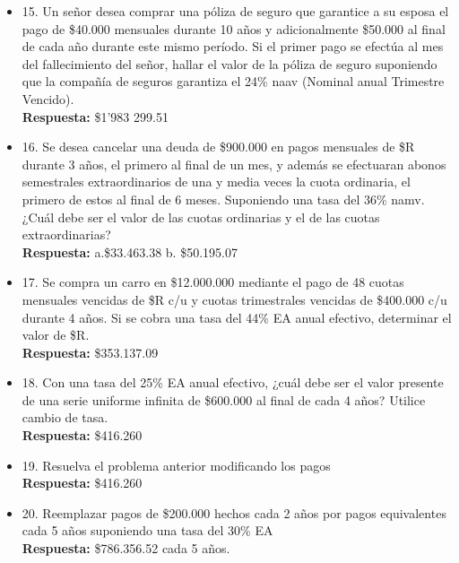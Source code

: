 \begin{itemize}
	\item 15. Un señor desea comprar una póliza de seguro que garantice a su esposa el pago de \$40.000 mensuales durante 10 años y adicionalmente \$50.000 al final de cada año durante este mismo período. Si el primer pago se efectúa al mes del fallecimiento del señor, hallar el valor de la póliza de seguro suponiendo que la compañía de seguros garantiza el 24\%  naav (Nominal anual Trimestre Vencido).\\
	\textbf{Respuesta:} \$1'983 299.51\\
	\medskip
	
	\item 16. Se desea cancelar una deuda de \$900.000 en pagos mensuales de \$R durante 3 años, el primero al final de un mes, y además se efectuaran abonos semestrales extraordinarios de una y media veces la cuota ordinaria, el primero de estos al final de 6 meses. Suponiendo una tasa del 36\% namv. ¿Cuál debe ser el valor de las cuotas ordinarias y el de las cuotas extraordinarias?\\
	\textbf{Respuesta:} a.\$33.463.38 \hspace{0,5cm} b. \$50.195.07\\
	\medskip
	
	\item 17. Se compra un carro en \$12.000.000 mediante el pago de 48 cuotas mensuales vencidas de \$R c/u y cuotas trimestrales vencidas de \$400.000 c/u durante 4 años. Si se cobra una tasa del 44\% EA  anual efectivo, determinar el valor de \$R.\\
	\textbf{Respuesta:} \$353.137.09\\
	\medskip
	
	\item 18. Con una tasa del 25\% EA  anual efectivo, ¿cuál debe ser el valor presente de una serie uniforme infinita de \$600.000 al final de cada 4 años? Utilice cambio de tasa.\\
	\textbf{Respuesta:} \$416.260\\
	\medskip
	
	\item 19. Resuelva el problema anterior modificando los pagos\\
	\textbf{Respuesta:} \$416.260\\
	\medskip
	
	\item 20. Reemplazar pagos de \$200.000 hechos cada 2 años por pagos equivalentes cada 5 años suponiendo una tasa del 30\% EA\\
	\textbf{Respuesta:} \$786.356.52 cada 5 años.
	\medskip
	

\end{itemize}

